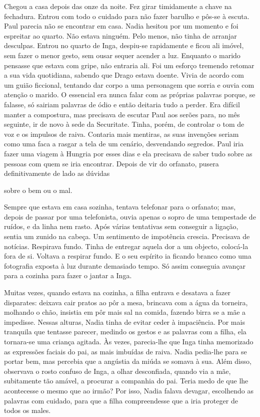 Chegou a casa depois das onze da noite. Fez girar timidamente a chave
na fechadura. Entrou com todo o cuidado para não fazer barulho e pôs-se
à escuta. Paul parecia não se encontrar em casa. Nadia hesitou por um
momento e foi espreitar ao quarto. Não estava ninguém. Pelo menos, não
tinha de arranjar desculpas. Entrou no quarto de Inga, despiu-se
rapidamente e ficou ali imóvel, sem fazer o menor gesto, sem ousar
sequer acender a luz. Enquanto o marido pensasse que estava com gripe,
não entraria ali. Foi um esforço tremendo retomar a sua vida quotidiana, sabendo que Drago estava doente. Vivia de acordo com um guião
ficcional, tentando dar corpo a uma personagem que sorria e ouvia com
atenção o marido. O essencial era nunca falar com as próprias palavras
porque, se falasse, só sairiam palavras de ódio e então deitaria tudo a
perder. Era difícil manter a compostura, mas precisava de escutar Paul
aos serões para, no mês seguinte, ir de novo à sede da Securitate.
Tinha, porém, de controlar o tom de voz e os impulsos de raiva. Contaria
mais mentiras, as suas invenções seriam como uma faca a rasgar a tela de
um cenário, desvendando segredos. Paul iria fazer uma viagem à Hungria
por esses dias e ela precisava de saber tudo sobre as pessoas com quem
se iria encontrar. Depois de vir do orfanato, pusera definitivamente de
lado as dúvidas

sobre o bem ou o mal.

Sempre que estava em casa sozinha, tentava telefonar para o orfanato;
mas, depois de passar por uma telefonista, ouvia apenas o sopro de uma
tempestade de ruídos, e da linha nem rasto. Após várias tentativas sem
conseguir
a ligação, sentia um zunido na cabeça. Um sentimento de impotência
crescia. Precisava de notícias. Respirava fundo. Tinha de entregar
aquela dor a um objecto, colocá-la fora de si. Voltava a respirar fundo.
E o seu espírito ia ficando branco como uma fotografia exposta à luz
durante demasiado tempo. Só assim conseguia avançar para a cozinha
para fazer o jantar a Inga.

Muitas vezes, quando estava na cozinha, a filha entrava e desatava a
fazer disparates: deixava cair pratos ao pôr a mesa, brincava com a água
da torneira, molhando o chão, insistia em pôr mais sal na comida,
fazendo birra se a mãe a impedisse. Nessas alturas, Nadia tinha de
evitar ceder à impaciência. Por mais tranquila que tentasse parecer,
medindo os gestos e as palavras com a filha, ela tornara-se uma criança
agitada. Às vezes, parecia-lhe que Inga tinha memorizado as expressões
faciais do pai, as mais imbuídas de raiva. Nadia pedia-lhe para se
portar bem, mas percebia que a angústia da miúda se somava à sua. Além
disso, observava o rosto confuso de Inga, a olhar desconfiada, quando
via a mãe, subitamente tão amável, a procurar a companhia do pai. Teria
medo de que lhe acontecesse o mesmo que ao irmão? Por isso, Nadia falava
devagar, escolhendo as palavras com cuidado, para que a filha
compreendesse que a iria proteger de todos os males.


